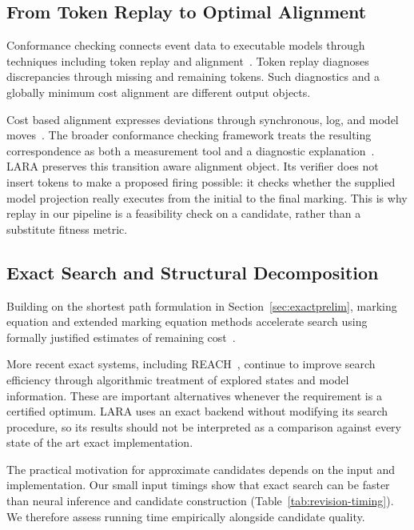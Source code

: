 \subsection{From Token Replay to Optimal Alignment}

\begin{revised}Conformance checking connects event data to executable models through techniques including token replay and alignment~\cite[Chapter~4]{Carmona2018}. Token replay diagnoses discrepancies through missing and remaining tokens. Such diagnostics and a globally minimum cost alignment are different output objects.\end{revised}

Cost based alignment expresses deviations through synchronous, log, and model moves~\cite{Adriansyah2011}. The broader conformance checking framework treats the resulting correspondence as both a measurement tool and a diagnostic explanation~\cite{Carmona2018}. LARA preserves this transition aware alignment object. Its verifier does not insert tokens to make a proposed firing possible: it checks whether the supplied model projection really executes from the initial to the final marking. This is why replay in our pipeline is a feasibility check on a candidate, rather than a substitute fitness metric.

\subsection{Exact Search and Structural Decomposition}

\begin{revised}Building on the shortest path formulation in Section~\ref{sec:exactprelim}, marking equation and extended marking equation methods accelerate search using formally justified estimates of remaining cost~\cite{Dongen2018}.\end{revised} More recent exact systems, including REACH~\cite{Casas2024}, continue to improve search efficiency through algorithmic treatment of explored states and model information. These are important alternatives whenever the requirement is a certified optimum. LARA uses an exact backend without modifying its search procedure, so its results should not be interpreted as a comparison against every state of the art exact implementation.

\begin{revised}The practical motivation for approximate candidates depends on the input and implementation. Our small input timings show that exact search can be faster than neural inference and candidate construction (Table~\ref{tab:revision-timing}). We therefore assess running time empirically alongside candidate quality.\end{revised}

